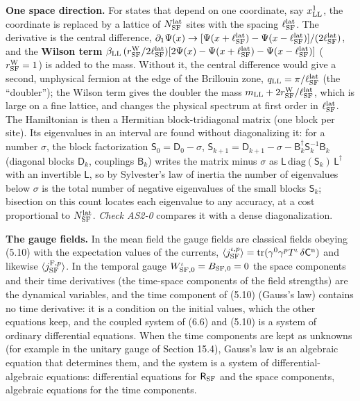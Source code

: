 \documentclass[
  10pt,
]{article}
\begin{document}
\textbf{One space direction.} For states that depend on one coordinate,
say \(x^1_{\rm LL}\), the coordinate is replaced by a lattice of
\(N^{\rm lat}_{\rm SF}\) sites with the spacing
\(\ell^{\rm lat}_{\rm SF}\). The derivative is the central difference,
\(\partial_1\Psi(x)\to[\Psi(x+\ell^{\rm lat}_{\rm SF})-\Psi(x-\ell^{\rm lat}_{\rm SF})]/(2\ell^{\rm lat}_{\rm SF})\),
and the \textbf{Wilson term}
\(\beta_{\rm LL}\,(r^{\rm W}_{\rm SF}/2\ell^{\rm lat}_{\rm SF})[2\Psi(x)-\Psi(x+\ell^{\rm lat}_{\rm SF})-\Psi(x-\ell^{\rm lat}_{\rm SF})]\)
(\(r^{\rm W}_{\rm SF}=1\)) is added to the mass. Without it, the central
difference would give a second, unphysical fermion at the edge of the
Brillouin zone, \(q_{\rm LL}=\pi/\ell^{\rm lat}_{\rm SF}\) (the
``doubler''); the Wilson term gives the doubler the mass
\(m_{\rm LL}+2r^{\rm W}_{\rm SF}/\ell^{\rm lat}_{\rm SF}\), which is
large on a fine lattice, and changes the physical spectrum at first
order in \(\ell^{\rm lat}_{\rm SF}\). The Hamiltonian is then a
Hermitian block-tridiagonal matrix (one block per site). Its eigenvalues
in an interval are found without diagonalizing it: for a number
\(\sigma\), the block factorization \(\mathsf S_0=\mathsf D_0-\sigma\),
\(\mathsf S_{k+1}=\mathsf D_{k+1}-\sigma-\mathsf B_k^\dagger\mathsf S_k^{-1}\mathsf B_k\)
(diagonal blocks \(\mathsf D_k\), couplings \(\mathsf B_k\)) writes the
matrix minus \(\sigma\) as
\(\mathsf L\,\mathrm{diag}(\mathsf S_k)\,\mathsf L^\dagger\) with an
invertible \(\mathsf L\), so by Sylvester's law of inertia the number of
eigenvalues below \(\sigma\) is the total number of negative eigenvalues
of the small blocks \(\mathsf S_k\); bisection on this count locates
each eigenvalue to any accuracy, at a cost proportional to
\(N^{\rm lat}_{\rm SF}\). \emph{Check AS2-0} compares it with a dense
diagonalization.

\textbf{The gauge fields.} In the mean field the gauge fields are
classical fields obeying (5.10) with the expectation values of the
currents,
\(\langle j^{\iota,p}_{\rm SF}\rangle=\mathrm{tr}(\gamma^0\gamma^pT^\iota\,\delta\mathsf C^{\rm n})\)
and likewise \(\langle j^{{\rm F},p}_{\rm SF}\rangle\). In the temporal
gauge \(W^\iota_{{\rm SF},0}=B_{{\rm SF},0}=0\) the space components and
their time derivatives (the time-space components of the field
strengths) are the dynamical variables, and the time component of (5.10)
(Gauss's law) contains no time derivative: it is a condition on the
initial values, which the other equations keep, and the coupled system
of (6.6) and (5.10) is a system of ordinary differential equations. When
the time components are kept as unknowns (for example in the unitary
gauge of Section 15.4), Gauss's law is an algebraic equation that
determines them, and the system is a system of differential-algebraic
equations: differential equations for \(\mathsf R_{\rm SF}\) and the
space components, algebraic equations for the time components.
\end{document}

